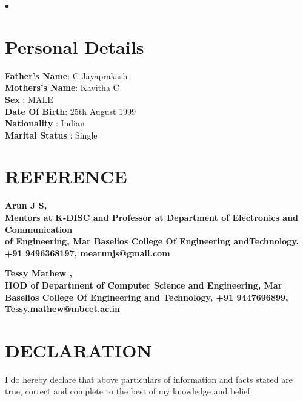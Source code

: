 \documentclass[margin,line]{res}
\newenvironment{list2}{
	\begin{list}{$\bullet$}{%
			\setlength{\itemsep}{0in}
			\setlength{\parsep}{0in} \setlength{\parskip}{0in}
			\setlength{\topsep}{0in} \setlength{\partopsep}{0in}
			\setlength{\leftmargin}{0.2in}}}{\end{list}}
\begin{document}
\begin{resume}
\begin{list2}
\end{list2}
\section{\sc Personal Details}
{\bf Father's Name}:  C Jayaprakash\\
{\bf Mothers's Name}:  Kavitha C\\
{\bf Sex}  :  MALE\\
{\bf Date Of Birth}:  25th August 1999\\
{\bf Nationality}       : Indian \\
{\bf Marital Status}       : Single \\

\section{\sc REFERENCE }

\bf Arun J S,\\ Mentors at K-DISC and
Professor at Department of Electronics and Communication\\ of Engineering, Mar Baselios College Of Engineering andTechnology, +91 9496368197, mearunjs@gmail.com

\bf Tessy Mathew ,\\ HOD of Department of Computer Science and Engineering, Mar Baselios College Of Engineering and Technology, +91 9447696899, Tessy.mathew@mbcet.ac.in

\section{\sc DECLARATION}
I do hereby declare that above particulars of information and facts stated are true, correct and complete to the best of my knowledge and belief.
\end{resume}
\end{document}
